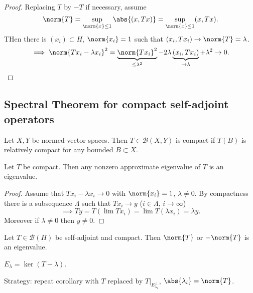 \documentclass{article}
\begin{document}
\begin{proof}
    Replacing $T$ by $-T$ if necessary, assume
    \begin{equation*}
        \norm{T} = \sup_{\norm{x} \leq 1} \abs{(x, Tx)} = \sup_{\norm{x} \leq 1} (x, Tx).
    \end{equation*}
    THen there is $(x_i) \subset H$, $\norm{x_i} = 1$ such that $(x_i, T x_i) \to \norm{T} = \lambda$.
    \begin{equation*}
        \implies \norm{T x_i - \lambda x_i}^2 = \underbrace{\norm{T x_i}^2}_{\leq \lambda^2} - 2 \lambda \underbrace{(x_i, T x_i)}_{\to \lambda} + \lambda^2 \to 0.
    \end{equation*}
\end{proof}

\subsection{Spectral Theorem for compact self-adjoint operators}
\begin{defi}
    Let $X, Y$ be normed vector spaces.
    Then $T \in \mathcal{B}(X, Y)$ is compact if $T(B)$ is relatively compact for any bounded $B \subset X$.
\end{defi}

\begin{lemma}
    Let $T$ be compact. Then any nonzero approximate eigenvalue of $T$ is an eigenvalue.
\end{lemma}

\begin{proof}
    Assume that $T x_i - \lambda x_i \to 0$ with $\norm{x_i} = 1$, $\lambda \neq 0$.
    By compactness there is a subsequence $\Lambda$ such that $T x_i \to y$ ($i \in \Lambda$, $i \to \infty$)
    \begin{equation*}
        \implies T y = T(\lim T x_i) = \lim T (\lambda x_i) = \lambda y.
    \end{equation*}
    Moreover if $\lambda \neq 0$ then $y \neq 0$.
\end{proof}

\begin{cor}
    Let $T \in \mathcal{B}(H)$ be self-adjoint and compact. Then $\norm{T}$ or $- \norm{T}$ is an eigenvalue.
\end{cor}

\begin{notation}
    $E_\lambda = \ker(T - \lambda)$.
\end{notation}
Strategy: repeat corollary with $T$ replaced by $T|_{E_{\lambda_1}^\perp}$, $\abs{\lambda_i} = \norm{T}$.
\end{document}
